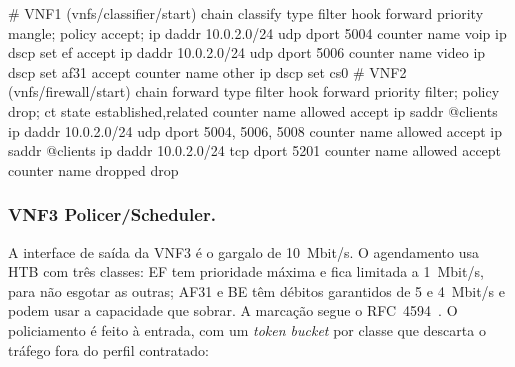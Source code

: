 \documentclass[a4paper]{llncs}
\begin{document}
\begin{code}
# VNF1 (vnfs/classifier/start)
chain classify {
  type filter hook forward priority mangle; policy accept;
  ip daddr 10.0.2.0/24 udp dport 5004 counter name voip  ip dscp set ef   accept
  ip daddr 10.0.2.0/24 udp dport 5006 counter name video ip dscp set af31 accept
  counter name other ip dscp set cs0
}
# VNF2 (vnfs/firewall/start)
chain forward {
  type filter hook forward priority filter; policy drop;
  ct state established,related counter name allowed accept
  ip saddr @clients ip daddr 10.0.2.0/24 udp dport { 5004, 5006, 5008 }
                                                   counter name allowed accept
  ip saddr @clients ip daddr 10.0.2.0/24 tcp dport { 5201 } counter name allowed accept
  counter name dropped drop
}
\end{code}

\subsubsection{VNF3 Policer/Scheduler.}
A interface de saída da VNF3 é o gargalo de 10~Mbit/s. O agendamento usa HTB com três
classes: EF tem prioridade máxima e fica limitada a 1~Mbit/s, para não esgotar as
outras; AF31 e BE têm débitos garantidos de 5 e 4~Mbit/s e podem usar a capacidade
que sobrar. A marcação segue o RFC~4594~\cite{rfc4594}. O policiamento é feito à entrada, com um \emph{token bucket} por classe que
descarta o tráfego fora do perfil contratado:

\end{document}
